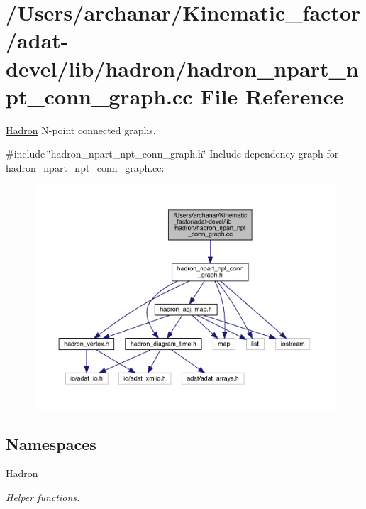 \hypertarget{adat-devel_2lib_2hadron_2hadron__npart__npt__conn__graph_8cc}{}\section{/\+Users/archanar/\+Kinematic\+\_\+factor/adat-\/devel/lib/hadron/hadron\+\_\+npart\+\_\+npt\+\_\+conn\+\_\+graph.cc File Reference}
\label{adat-devel_2lib_2hadron_2hadron__npart__npt__conn__graph_8cc}


\mbox{\hyperlink{namespaceHadron}{Hadron}} N-\/point connected graphs.  


{\ttfamily \#include \char`\"{}hadron\+\_\+npart\+\_\+npt\+\_\+conn\+\_\+graph.\+h\char`\"{}}\newline
Include dependency graph for hadron\+\_\+npart\+\_\+npt\+\_\+conn\+\_\+graph.\+cc\+:
\nopagebreak
\begin{figure}[H]
\begin{center}
\leavevmode
\includegraphics[width=350pt]{dd/d27/adat-devel_2lib_2hadron_2hadron__npart__npt__conn__graph_8cc__incl}
\end{center}
\end{figure}
\subsection*{Namespaces}
\begin{DoxyCompactItemize}
\item 
 \mbox{\hyperlink{namespaceHadron}{Hadron}}
\begin{DoxyCompactList}\small\item\em Helper functions. \end{DoxyCompactList}\end{DoxyCompactItemize}
